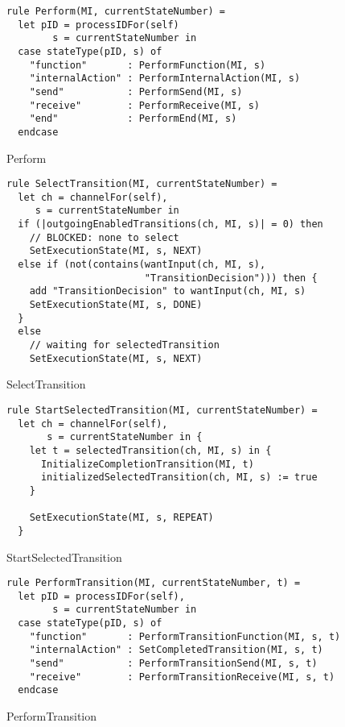 \begin{listing}[H]
\begin{verbatim}
rule Perform(MI, currentStateNumber) =
  let pID = processIDFor(self)
        s = currentStateNumber in
  case stateType(pID, s) of
    "function"       : PerformFunction(MI, s)
    "internalAction" : PerformInternalAction(MI, s)
    "send"           : PerformSend(MI, s)
    "receive"        : PerformReceive(MI, s)
    "end"            : PerformEnd(MI, s)
  endcase
\end{verbatim}
\caption{Perform}
\label{lst:asm:Perform}
\end{listing}


\begin{listing}[H]
\begin{verbatim}
rule SelectTransition(MI, currentStateNumber) =
  let ch = channelFor(self),
     s = currentStateNumber in
  if (|outgoingEnabledTransitions(ch, MI, s)| = 0) then
    // BLOCKED: none to select
    SetExecutionState(MI, s, NEXT)
  else if (not(contains(wantInput(ch, MI, s),
                        "TransitionDecision"))) then {
    add "TransitionDecision" to wantInput(ch, MI, s)
    SetExecutionState(MI, s, DONE)
  }
  else
    // waiting for selectedTransition
    SetExecutionState(MI, s, NEXT)
\end{verbatim}
\caption{SelectTransition}
\label{lst:asm:SelectTransition}
\end{listing}



\begin{listing}[H]
\begin{verbatim}
rule StartSelectedTransition(MI, currentStateNumber) =
  let ch = channelFor(self),
       s = currentStateNumber in {
    let t = selectedTransition(ch, MI, s) in {
      InitializeCompletionTransition(MI, t)
      initializedSelectedTransition(ch, MI, s) := true
    }

    SetExecutionState(MI, s, REPEAT)
  }
\end{verbatim}
\caption{StartSelectedTransition}
\label{lst:asm:StartSelectedTransition}
\end{listing}




\begin{listing}[H]
\begin{verbatim}
rule PerformTransition(MI, currentStateNumber, t) =
  let pID = processIDFor(self),
        s = currentStateNumber in
  case stateType(pID, s) of
    "function"       : PerformTransitionFunction(MI, s, t)
    "internalAction" : SetCompletedTransition(MI, s, t)
    "send"           : PerformTransitionSend(MI, s, t)
    "receive"        : PerformTransitionReceive(MI, s, t)
  endcase
\end{verbatim}
\caption{PerformTransition}
\label{lst:asm:PerformTransition}
\end{listing}



